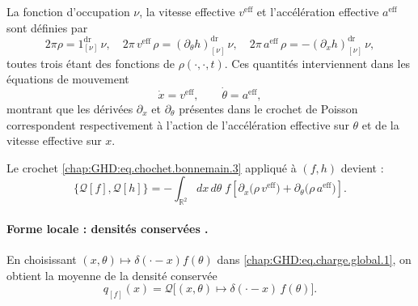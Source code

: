 La fonction d’occupation $\nu$, la vitesse effective $v^{\mathrm{eff}}$ et l’accélération effective $a^{\mathrm{eff}}$ sont définies par
\begin{equation}\label{chap:GHD:eq.nu.v.a.1}
	2 \pi \rho =  1^{\mathrm{dr}}_{[\nu]} \, \nu , 
	\quad 2 \pi \, v^{\mathrm{eff}} \, \rho  =(\partial_\theta h )^{\mathrm{dr}}_{[\nu]} \, \nu , 
	\quad 2 \pi \, a^{\mathrm{eff}} \, \rho  = -(\partial_x h )^{\mathrm{dr}}_{[\nu]}\, \nu ,
\end{equation}
toutes trois étant des fonctions de $\rho(\cdot,\cdot,t)$. Ces quantités interviennent dans les équations de mouvement
\begin{equation}\label{chap:GHD:eq.nu.v.a.1.1}
	\dot{x} = v^{\mathrm{eff}}, \qquad \dot{\theta} = a^{\mathrm{eff}},
\end{equation}
montrant que les dérivées $\partial_x$ et $\partial_\theta$ présentes dans le crochet de Poisson correspondent respectivement à l'action de l'accélération effective sur $\theta$ et de la vitesse effective sur $x$.

\medskip 

Le crochet \eqref{chap:GHD:eq.chochet.bonnemain.3} appliqué à $(f,h)$ devient :
\begin{equation}\label{chap:GHD:eq.chochet.bonnemain.4}
	\{\mathcal{Q}[f], \mathcal{Q}[h]\} 
	= - \int_{\mathbb{R}^2} dx\, d\theta \; f \left[ \partial_x \big( \rho \, v^{\mathrm{eff}} \big) 
	+ \partial_\theta \big( \rho \, a^{\mathrm{eff}} \big) \right].
\end{equation}

\paragraph{Forme locale : densités conservées .} 
En choisissant $(x,\theta) \mapsto \delta(\cdot - x)f(\theta)$ dans \eqref{chap:GHD:eq.charge.global.1}, on obtient la moyenne de la densité conservée \ie
\begin{equation}
	q_{[f]}(x) = \mathcal{Q} \big[ (x,\theta) \mapsto \delta(\cdot - x) \, f(\theta) \big].
\end{equation}


